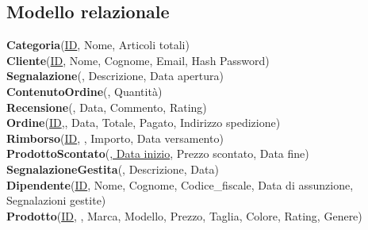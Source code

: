 \subsection{Modello relazionale}

\textbf{Categoria}(\uline{ID}, Nome, Articoli totali)\\
\textbf{Cliente}(\uline{ID}, Nome, Cognome, Email, Hash Password)\\
\textbf{Segnalazione}(, Descrizione, Data apertura)\\
\textbf{ContenutoOrdine}(\uline{}, Quantità)\\
\textbf{Recensione}(\uline{}, Data, Commento, Rating)\\
\textbf{Ordine}(\uline{ID},, Data, Totale, Pagato, Indirizzo spedizione)\\
\textbf{Rimborso}(\uline{ID}, , Importo, Data versamento)\\
\textbf{ProdottoScontato}(\uline{, Data inizio}, Prezzo scontato, Data fine)\\
\textbf{SegnalazioneGestita}(\uline{}, Descrizione, Data)\\
\textbf{Dipendente}(\uline{ID}, Nome, Cognome, Codice\_fiscale, Data di assunzione, Segnalazioni gestite)\\
\textbf{Prodotto}(\uline{ID}, , Marca,  Modello, Prezzo, Taglia, Colore, Rating, Genere)\\
